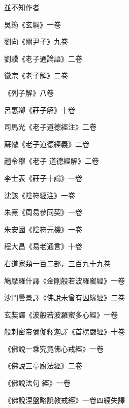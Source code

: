 \begin{pinyinscope}
 並不知作者



 吳筠《玄綱》一卷



 劉向《關尹子》九卷



 劉驥《老子通論語》二卷



 徽宗《老子解》二卷



 《列子解》八卷



 呂惠卿《莊子解》十卷



 司馬光《老子道德經注》二卷



 蘇轍《老子道德經義》二卷



 趙令穆《老子
 道德經解》二卷



 李士表《莊子十論》一卷



 沈該《陰符經注》一卷



 朱熹《周易參同契》一卷



 朱安國《陰符元機》一卷



 程大昌《易老通言》十卷



 右道家類一百二部，三百九十九卷



 鳩摩羅什譯《金剛般若波羅蜜經》一卷



 沙門曇景譯《佛說未曾有因緣經》二卷



 玄奘譯《波般若波羅蜜多心經》一卷



 般刺密帝彌伽釋迦譯《首楞嚴經》十卷



 《佛說一乘究竟佛心戒經》一卷



 《佛說三亭廚法經》二卷



 《佛說法句
 經》一卷



 《佛說涅盤略說教戒經》一卷四經失譯




\end{pinyinscope}

